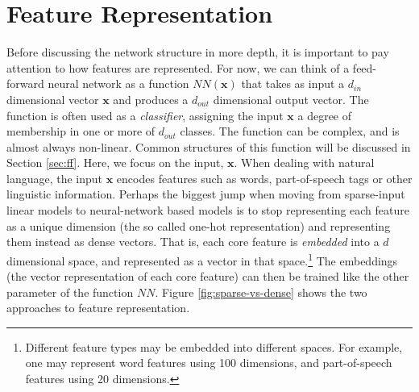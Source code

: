\documentclass[jair,twoside,11pt,theapa]{article}
\newcommand{\m}[1]{\mathbf{#1}}%
\begin{document}
{\clearpage
\section{Feature Representation}

Before discussing the network structure in more depth, it is important to pay
attention to how features are represented.
For now, we can think of a feed-forward neural network as a function $NN(\m{x})$ that
takes as input a $d_{in}$ dimensional vector $\m{x}$ and produces a $d_{out}$
dimensional output vector. The function is often used as a \emph{classifier},
assigning the input $\m{x}$ a degree of membership in one or more of $d_{out}$
classes.  The function can be complex, and is almost always
non-linear.  Common structures of this function will be discussed in Section
\ref{sec:ff}. Here, we focus on the input, $\m{x}$.
When dealing with natural language, the 
input $\m{x}$ encodes features such as words, part-of-speech tags or other
linguistic information. Perhaps the biggest jump when
moving from sparse-input linear models to neural-network based models is to stop
representing each feature as a unique dimension (the so called one-hot
representation) and representing them instead as dense vectors.  That is,
each core feature is \emph{embedded} into a $d$ dimensional
space, and
represented as a vector in that space.\footnote{Different feature types may be embedded into different spaces.
For example, one may represent word features using 100 dimensions, and
part-of-speech features using 20 dimensions.}
The embeddings (the vector
representation of each core feature) can then be trained like the other parameter
of the function $NN$. Figure \ref{fig:sparse-vs-dense} shows the two approaches
to feature representation.

}
\end{document}
